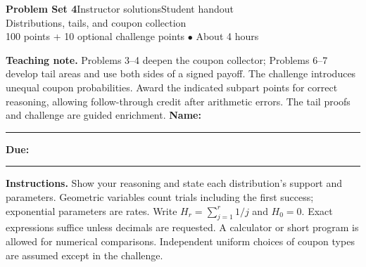 \documentclass[11pt,letterpaper]{article}
\newcommand{\edition}{\ifsolutions Instructor solutions\else Student handout\fi}
\begin{document}
{\LARGE\bfseries\color{indigo}Problem Set 4}\hfill{\small\color{mint}\edition}\\[4pt]
{\large Distributions, tails, and coupon collection}\\[4pt]
{\small\color{muted}100 points + 10 optional challenge points \quad $\bullet$ \quad About 4 hours}\par
\ifsolutions
\textbf{Teaching note.} Problems 3--4 deepen the coupon collector; Problems
6--7 develop tail areas and use both sides of a signed payoff.
The challenge introduces unequal coupon probabilities.
Award the indicated subpart points for correct reasoning, allowing follow-through
credit after arithmetic errors. The tail proofs and challenge are guided enrichment.
\else
\textbf{Name:}\ \rule{.46\linewidth}{.4pt}\hfill
\textbf{Due:}\ \rule{.20\linewidth}{.4pt}
\fi
\par\medskip
\textbf{Instructions.} Show your reasoning and state each distribution's
support and parameters. Geometric variables count trials including the
first success; exponential parameters are rates. Write $H_r=\sum_{j=1}^r1/j$
and $H_0=0$. Exact expressions suffice unless decimals are requested.
A calculator or short program is allowed for numerical comparisons.
Independent uniform choices of coupon types are assumed except in the challenge.
\end{document}
